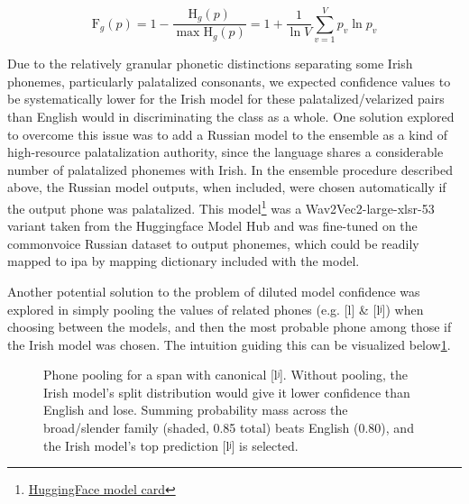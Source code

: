 \documentclass[thesis]{cluu}
\newcommand{\ipa}[1]{{\ipafont #1}}
\begin{document}
 \begin{equation}\label{gibbs}
  \mathrm{F}_{g}(p)=1-\frac{\mathrm{H}_{g}(p)}{\max \mathrm{H}_{g}(p)}=1+\frac{1}{\ln V}\sum_{v=1}^{V} p_v \ln p_v
 \end{equation}

Due to the relatively granular phonetic distinctions separating some Irish phonemes, particularly palatalized consonants, we expected confidence values to be systematically lower for the Irish model for these palatalized/velarized pairs than English would in discriminating the class as a whole. One solution explored to overcome this issue was to add a Russian model to the ensemble as a kind of high-resource palatalization authority, since the language shares a considerable number of palatalized phonemes with Irish. In the ensemble procedure described above, the Russian model outputs, when included, were chosen automatically if the output phone was palatalized. This model\footnote{\href{https://huggingface.co/snu-nia-12/wav2vec-large-xlsr-53_nia12_phone-nsu-ai-russian/tree/main}{HuggingFace model card}} was a Wav2Vec2-large-xlsr-53 variant taken from the Huggingface Model Hub and was fine-tuned on the commonvoice Russian dataset to output phonemes, which could be readily mapped to \gls{ipa} by mapping dictionary included with the model.

Another potential solution to the problem of diluted model confidence was explored in simply pooling the values of related phones (e.g. [\ipa{l}] \& [\ipa{lʲ}]) when choosing between the models, and then the most probable phone among those if the Irish model was chosen. The intuition guiding this can be visualized below\ref{fig:pool_ga_example}.

\begin{figure}[ht]
\centering
{}
\caption{Phone pooling for a span with canonical [\ipa{lʲ}].
  Without pooling, the Irish model's split distribution would give it lower confidence than English and lose. Summing probability mass across the broad/slender family (shaded, 0.85 total) beats English (0.80), and the Irish model's top prediction [\ipa{lʲ}] is selected.}
\label{fig:pool_ga_example}
\end{figure}
\end{document}
